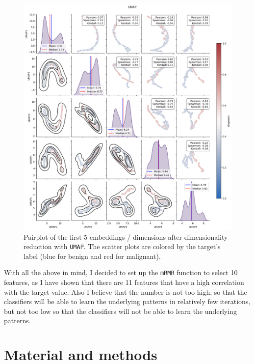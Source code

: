\documentclass[12pt]{article}
\begin{document}
\begin{figure}[H]
    \centering
    \includegraphics[width=\textwidth]{ims/umap.png}
    \caption{Pairplot of the first 5 embeddings / dimensions after
    dimensionality reduction with \texttt{UMAP}. The scatter plots are colored
    by the target's label (blue for benign and red for malignant).}
    \label{fig:umap}
\end{figure}

With all the above in mind, I decided to set up the \texttt{mRMR} function to
select 10 features, as I have shown that there are 11 features that have a
high correlation with the target value. Also I believe that the number is not
too high, so that the classifiers will be able to learn the underlying
patterns in relatively few iterations, but not too low so that the classifiers
will not be able to learn the underlying patterns.

\section{Material and methods}
\end{document}
